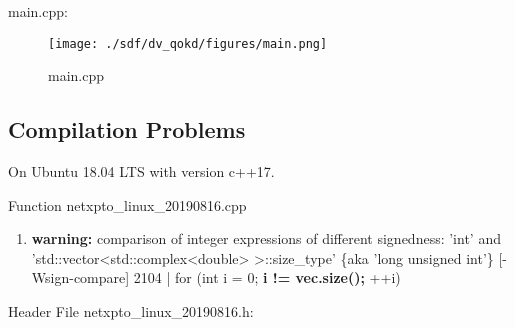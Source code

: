 main.cpp:
\begin{figure}[h]
	\centering\texttt{[image: ./sdf/dv\_qokd/figures/main.png]}
	\caption{main.cpp}
	\label{fig:message}
\end{figure}



\subsection{Compilation Problems} 
On Ubuntu 18.04 LTS with version c++17.

Function netxpto\_linux\_20190816.cpp

\begin{enumerate}	
	\item \textbf{warning:} comparison of integer expressions of different signedness: 'int' and 'std::vector<std::complex<double> >::size\_type' \{aka 'long unsigned int'\} [-Wsign-compare]
	2104 |  for (int i = 0; \textbf{i != vec.size();} ++i)
\end{enumerate}

Header File netxpto\_linux\_20190816.h:

